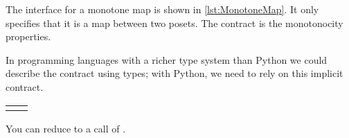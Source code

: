 
The interface for a monotone map is shown in \cref{lst:MonotoneMap}.
It only specifies that it is a map between two posets.
The contract is the monotonocity properties.

In programming languages with a richer type system than Python we could describe the contract using types; with Python, we need to rely on this implicit contract.
\begin{widepar}
	\begin{tabular}{cc}
		\begin{minipage}{0.4\textwidth}
			\classlisting{MonotoneMap}
		\end{minipage}
		 &
		\begin{minipage}{0.4\textwidth}
			\classlisting{FiniteMonotoneMap}
		\end{minipage}
	\end{tabular}
\end{widepar}



\begin{hint}
	You can reduce  to a call of .
\end{hint}
